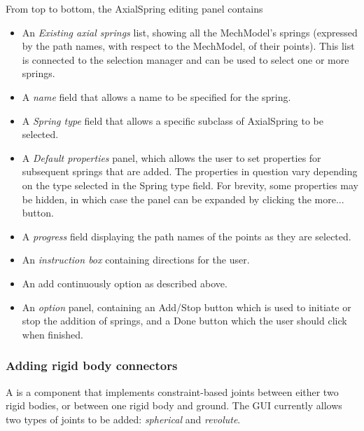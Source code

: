 \documentclass{article}
\begin{document}
From top to bottom, the AxialSpring editing panel contains

\begin{itemize}

\item An {\it Existing axial springs} list, showing all the MechModel's
springs (expressed by the path names, with respect to the MechModel,
of their points). This list is connected to the selection manager and
can be used to select one or more springs.

\item A {\it name} field that allows a name to be specified for the spring.

\item A {\it Spring type} field that allows a specific subclass of AxialSpring
to be selected.

\item A {\it Default properties} panel, which allows the user to set
properties for subsequent springs that are added. The properties in
question vary depending on the type selected in the {\sf Spring type}
field. For brevity, some properties may be hidden, in which case the
panel can be expanded by clicking the {\sf more...} button.

\item A {\it progress} field displaying the path names of the points
as they are selected.

\item An {\it instruction box} containing directions for the user.

\item An {\sf add continuously} option as described above.

\item An {\it option} panel, containing an {\sf Add/Stop} button which is used
to initiate or stop the addition of springs, and a {\sf Done} button which
the user should click when finished.

\end{itemize}

\subsubsection{Adding rigid body connectors}

A  is a component
that implements constraint-based joints between either two rigid bodies, or
between one rigid body and ground. The GUI currently allows two types
of joints to be added: {\it spherical} and {\it revolute}.
\end{document}
